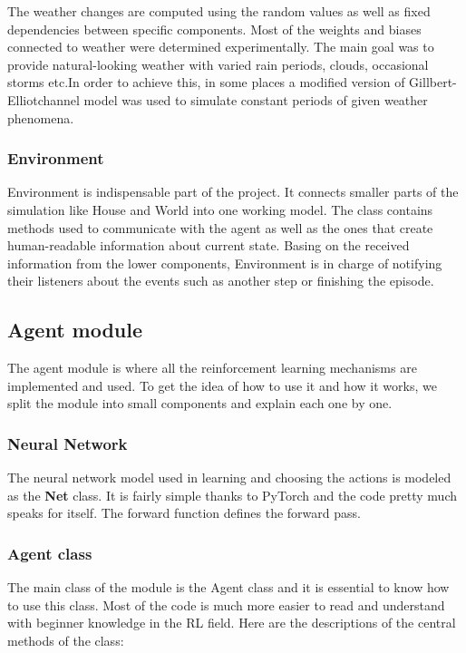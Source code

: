 \documentclass{article}
\begin{document}
The weather changes are computed using the random values as well as fixed dependencies between specific components. Most of the weights and biases connected to weather were determined experimentally. The main goal was to provide natural-looking weather with varied rain periods, clouds, occasional storms etc.In order to achieve this, in some places a modified version of Gillbert-Elliotchannel model was used to simulate constant periods of given weather phenomena.

\subsubsection{Environment}
Environment is indispensable part of the project. It connects smaller parts of the simulation like House and World into one working model. The class contains methods used to communicate with the agent as well as the ones that create human-readable information about current state.    Basing on the received information from the lower components, Environment is in charge of notifying their listeners about the events such as another step or finishing the episode.

\subsection{Agent module}
The agent module is where all the reinforcement learning mechanisms are implemented and used. To get the idea of how to use it and how it works, we split the module into small components and explain each one by one.
\subsubsection{Neural Network}
The neural network model used in learning and choosing the actions is modeled as the \textbf{Net} class. It is fairly simple thanks to PyTorch and the code pretty much speaks for itself. The forward function defines the forward pass.

\subsubsection{Agent class}
The main class of the module is the Agent class and it is essential to know how to use this class. Most of the code is much more easier to read and understand with beginner knowledge in the RL field. Here are the descriptions of the central methods of the class:
\end{document}
